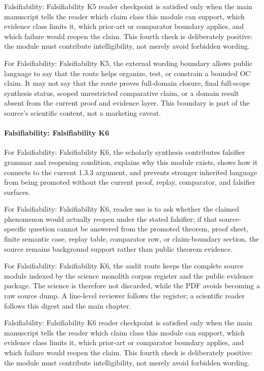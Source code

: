 Falsifiability: Falsifiability K5 reader checkpoint is satisfied only when the main manuscript tells the reader which claim class this module can support, which evidence class limits it, which prior-art or comparator boundary applies, and which failure would reopen the claim. This fourth check is deliberately positive: the module must contribute intelligibility, not merely avoid forbidden wording.


For Falsifiability: Falsifiability K5, the external wording boundary allows public language to say that the route helps organize, test, or constrain a bounded OC claim. It may not say that the route proves full-domain closure, final full-scope synthesis status, scoped unrestricted comparative claim, or a domain result absent from the current proof and evidence layer. This boundary is part of the source's scientific content, not a marketing caveat.


\paragraph{Falsifiability: Falsifiability K6}

For Falsifiability: Falsifiability K6, the scholarly synthesis contributes falsifier grammar and reopening condition, explains why this module exists, shows how it connects to the current 1.3.3 argument, and prevents stronger inherited language from being promoted without the current proof, replay, comparator, and falsifier surfaces.


For Falsifiability: Falsifiability K6, reader use is to ask whether the claimed phenomenon would actually reopen under the stated falsifier; if that source-specific question cannot be answered from the promoted theorem, proof sheet, finite semantic case, replay table, comparator row, or claim-boundary section, the source remains background support rather than public theorem evidence.


For Falsifiability: Falsifiability K6, the audit route keeps the complete source module indexed by the science monolith corpus register and the public evidence package. The science is therefore not discarded, while the PDF avoids becoming a raw source dump. A line-level reviewer follows the register; a scientific reader follows this digest and the main chapter.


Falsifiability: Falsifiability K6 reader checkpoint is satisfied only when the main manuscript tells the reader which claim class this module can support, which evidence class limits it, which prior-art or comparator boundary applies, and which failure would reopen the claim. This fourth check is deliberately positive: the module must contribute intelligibility, not merely avoid forbidden wording.


